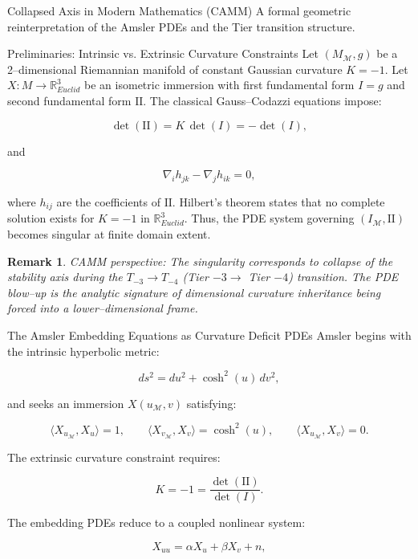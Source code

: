 \documentclass[final,onefignum,onetabnum]{siamart}
\newtheorem{remark}{Remark}
\begin{document}
\begin{section}{Collapsed Axis in Modern Mathematics (CAMM)}
A formal geometric reinterpretation of the Amsler PDEs and the Tier transition structure.

\begin{subsection}{Preliminaries: Intrinsic vs. Extrinsic Curvature Constraints}
Let $(M_{\mathcal{M}},g)$ be a 2–dimensional Riemannian manifold of constant Gaussian curvature $K=-1$. Let $X : M \to \mathbb{R}_{Euclid}^3$ be an isometric immersion with first fundamental form $I=g$ and second fundamental form $\mathrm{II}$. The classical Gauss–Codazzi equations impose:


\[
\det(\mathrm{II}) = K \, \det(I) = -\det(I),
\]


and


\[
\nabla_i h_{jk} - \nabla_j h_{ik} = 0,
\]


where $h_{ij}$ are the coefficients of $\mathrm{II}$.
Hilbert’s theorem states that no complete solution exists for $K=-1$ in $\mathbb{R}_{Euclid}^3$. Thus, the PDE system governing $(I_{\mathcal{M}},\mathrm{II})$ becomes singular at finite domain extent.

\begin{remark}
CAMM perspective: The singularity corresponds to collapse of the stability axis during the $T_{-3} \to T_{-4}$ (Tier $-3 \to$ Tier $-4$) transition. The PDE blow–up is the analytic signature of dimensional curvature inheritance being forced into a lower–dimensional frame.
\end{remark}
\end{subsection}

\begin{subsection}{The Amsler Embedding Equations as Curvature Deficit PDEs}
Amsler begins with the intrinsic hyperbolic metric:


\[
ds^{2} = du^{2} + \cosh^{2}(u)\, dv^{2},
\]


and seeks an immersion \(X(u_{\mathcal{M}},v)\) satisfying:


\[
\langle X_{u_{\mathcal{M}}}, X_{u} \rangle = 1, \qquad
\langle X_{v_{\mathcal{M}}}, X_{v} \rangle = \cosh^{2}(u), \qquad
\langle X_{u_{\mathcal{M}}}, X_{v} \rangle = 0.
\]


The extrinsic curvature constraint requires:


\[
K = -1 = \frac{\det(\mathrm{II})}{\det(I)}.
\]


The embedding PDEs reduce to a coupled nonlinear system:


\[
X_{uu} = \alpha X_{u} + \beta X_{v} + n,
\]



\end{subsection}
\end{section}
\end{document}
